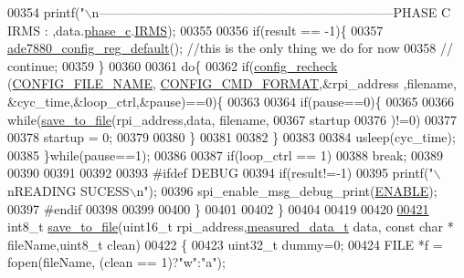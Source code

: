 \begin{DoxyCode}
{{{{{{{{{{{{{{{{{00354         printf(\textcolor{stringliteral}{"\(\backslash\)n---------------------------------------------------------------------PHASE C IRMS : %
      ,data.\hyperlink{a00029_ad8892f27909cf51f7603adfc00d224df}{phase\_c}.\hyperlink{a00030_a4f87f30b543e89e2e5dfa1b8f3f58eff}{IRMS});
00355                      
00356         \textcolor{keywordflow}{if}(result == -1)\{            
00357             \hyperlink{a00005_ga7782772c18e6ea515dcd28dcaedd0f06}{ade7880\_config\_reg\_default}(); \textcolor{comment}{//this is the only thing we do for now}
00358         \textcolor{comment}{//  continue;}
00359         \}
00360         
00361         \textcolor{keywordflow}{do}\{
00362         \textcolor{keywordflow}{if}(\hyperlink{a00003_gac93e16d1e9d6a04b52373bf3428cc79c}{config\_recheck} (\hyperlink{a00037_a62921b92fa4fb37f1e3a5d4c644fc1d8}{CONFIG\_FILE\_NAME},
      \hyperlink{a00037_a4891d4b97842b3419b2252198ace033f}{CONFIG\_CMD\_FORMAT},&rpi\_address ,filename, &cyc\_time,&loop\_ctrl,&pause)==0)\{
00363         
00364         \textcolor{keywordflow}{if}(pause==0)\{
00365         
00366           \textcolor{keywordflow}{while}(\hyperlink{a00003_ga9e259879c5d746107c4a70fe08aba924}{save\_to\_file}(rpi\_address,data, filename,
00367           startup 
00376           )!=0)
00377         
00378           startup = 0; 
00379           
00380          \}
00381          
00382          \}
00383          
00384          usleep(cyc\_time);
00385         \}\textcolor{keywordflow}{while}(pause==1);
00386          
00387         \textcolor{keywordflow}{if}(loop\_ctrl == 1)
00388         \textcolor{keywordflow}{break};
00389         
00390         
00391         
00392                 
00393 \textcolor{preprocessor}{        #ifdef DEBUG}
00394 \textcolor{preprocessor}{}        \textcolor{keywordflow}{if}(result!=-1)
00395         printf(\textcolor{stringliteral}{"\(\backslash\)nREADING SUCESS\(\backslash\)n"});
00396         spi\_enable\_msg\_debug\_print(\hyperlink{a00037_a514ad415fb6125ba296793df7d1a468a}{ENABLE});
00397 \textcolor{preprocessor}{        #endif}
00398 \textcolor{preprocessor}{}        
00399         
00400      \}
00401 
00402 \}
00404 
00419 
00420 
\hypertarget{a00035_source_l00421}{}\hyperlink{a00003_ga9e259879c5d746107c4a70fe08aba924}{00421} int8\_t \hyperlink{a00003_ga9e259879c5d746107c4a70fe08aba924}{save\_to\_file}(uint16\_t rpi\_address,\hyperlink{a00029}{measured\_data\_t} data, \textcolor{keyword}{const} \textcolor{keywordtype}{char} *
      fileName,uint8\_t clean) 
00422 \{ 
00423 uint32\_t dummy=0;
00424   FILE *f = fopen(fileName, (clean == 1)?\textcolor{stringliteral}{"w"}:\textcolor{stringliteral}{"a"});  
}}}}}}}}}}}}}}}}}}
\end{DoxyCode}
